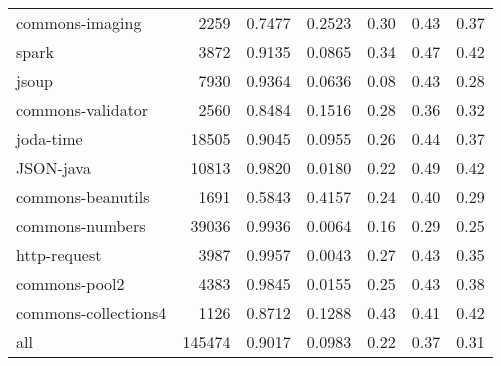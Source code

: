 \begin{table*}
\begin{tabular}{lrrrrrr}
        commons-imaging &    2259 &          0.7477 &          0.2523 &         0.30 &         0.43 &             0.37 \\
                  spark &    3872 &          0.9135 &          0.0865 &         0.34 &         0.47 &             0.42 \\
                  jsoup &    7930 &          0.9364 &          0.0636 &         0.08 &         0.43 &             0.28 \\
      commons-validator &    2560 &          0.8484 &          0.1516 &         0.28 &         0.36 &             0.32 \\
              joda-time &   18505 &          0.9045 &          0.0955 &         0.26 &         0.44 &             0.37 \\
              JSON-java &   10813 &          0.9820 &          0.0180 &         0.22 &         0.49 &             0.42 \\
      commons-beanutils &    1691 &          0.5843 &          0.4157 &         0.24 &         0.40 &             0.29 \\
        commons-numbers &   39036 &          0.9936 &          0.0064 &         0.16 &         0.29 &             0.25 \\
           http-request &    3987 &          0.9957 &          0.0043 &         0.27 &         0.43 &             0.35 \\
          commons-pool2 &    4383 &          0.9845 &          0.0155 &         0.25 &         0.43 &             0.38 \\
   commons-collections4 &    1126 &          0.8712 &          0.1288 &         0.43 &         0.41 &             0.42 \\
                    all &  145474 &          0.9017 &          0.0983 &         0.22 &         0.37 &             0.31 \\
\bottomrule
\end{tabular}
\end{table*}
